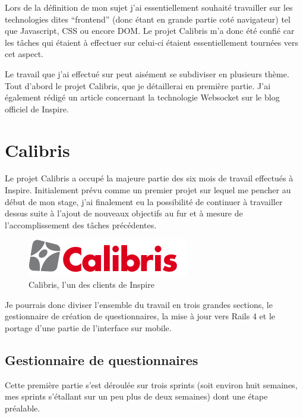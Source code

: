 \documentclass[12pt,a4paper]{book}
\begin{document}
Lors de la définition de mon sujet j'ai essentiellement souhaité travailler sur les technologies dites ``frontend'' (donc étant en grande partie coté navigateur) tel que Javascript, CSS ou encore DOM. Le projet Calibris m'a donc été confié car les tâches qui étaient à effectuer sur celui-ci étaient essentiellement tournées vers cet aspect.

Le travail que j'ai effectué sur peut aisément se subdiviser en plusieurs thème. Tout d'abord le projet Calibris, que je détaillerai en première partie. J'ai également rédigé un article concernant la technologie Websocket sur le blog officiel de Inspire.

\section{Calibris}

Le projet Calibris a occupé la majeure partie des six mois de travail effectués à Inspire. Initialement prévu comme un premier projet sur lequel me pencher au début de mon stage, j'ai finalement eu la possibilité de continuer à travailler dessus suite à l'ajout de nouveaux objectifs au fur et à mesure de l'accomplissement des tâches précédentes.

\begin{figure}[htp]
\centering
\includegraphics[scale=.60]{img/calibris.jpg}
 \caption{Calibris, l'un des clients de Inspire}
 \label{fig.jira_agile1}
\end{figure}

Je pourrais donc diviser l'ensemble du travail en trois grandes sections, le gestionnaire de création de questionnaires, la mise à jour vers Rails 4 et le portage d'une partie de l'interface sur mobile.

\subsection{Gestionnaire de questionnaires}

Cette première partie s'est déroulée sur trois sprints (soit environ huit semaines, mes sprints s'étallant sur un peu plus de deux semaines) dont une étape préalable. 
\end{document}
